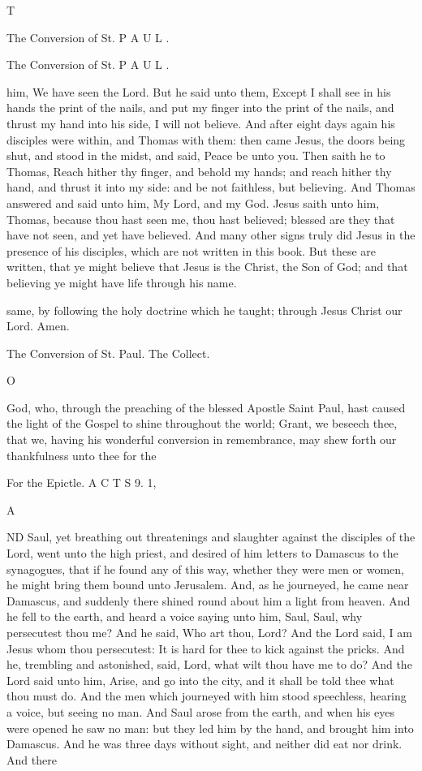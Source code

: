 T

The Conversion of St. P A U L .

The Conversion of St. P A U L .

him, We have seen the Lord. But he said unto them, Except I shall see in his hands the print of the nails, and put my finger into the print of the nails, and thrust my hand into his side, I will not believe. And after eight days again his disciples were within, and Thomas with them: then came Jesus, the doors being shut, and stood in the midst, and said, Peace be unto you. Then saith he to Thomas, Reach hither thy finger, and behold my hands; and reach hither thy hand, and thrust it into my side: and be not faithless, but believing. And Thomas answered and said unto him, My Lord, and my God. Jesus saith unto him, Thomas, because thou hast seen me, thou hast believed; blessed are they that have not seen, and yet have believed. And many other signs truly did Jesus in the presence of his disciples, which are not written in this book. But these are written, that ye might believe that Jesus is the Christ, the Son of God; and that believing ye might have life through his name.

same, by following the holy doctrine which he taught; through Jesus Christ our Lord. Amen.

The Conversion of St. Paul. The Collect.

O

God, who, through the preaching of the blessed Apostle Saint Paul, hast caused the light of the Gospel to shine throughout the world; Grant, we beseech thee, that we, having his wonderful conversion in remembrance, may shew forth our thankfulness unto thee for the

For the Epictle. A C T S 9. 1,

A

ND Saul, yet breathing out threatenings and slaughter against the disciples of the Lord, went unto the high priest, and desired of him letters to Damascus to the synagogues, that if he found any of this way, whether they were men or women, he might bring them bound unto Jerusalem. And, as he journeyed, he came near Damascus, and suddenly there shined round about him a light from heaven. And he fell to the earth, and heard a voice saying unto him, Saul, Saul, why persecutest thou me? And he said, Who art thou, Lord? And the Lord said, I am Jesus whom thou persecutest: It is hard for thee to kick against the pricks. And he, trembling and astonished, said, Lord, what wilt thou have me to do? And the Lord said unto him, Arise, and go into the city, and it shall be told thee what thou must do. And the men which journeyed with him stood speechless, hearing a voice, but seeing no man. And Saul arose from the earth, and when his eyes were opened he saw no man: but they led him by the hand, and brought him into Damascus. And he was three days without sight, and neither did eat nor drink. And there

